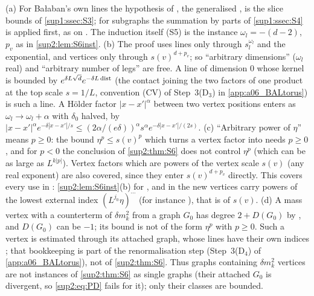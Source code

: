 \begin{remark}\label{sup2:rem:S6scope}
\textup{(a)} For Ba{\l}aban's own lines the hypothesis of \cite[Prop.~2.2]{Ba3}, the generalised \cite[(2.13)--(2.14)]{Ba3}, is the slice bounds of \cref{sup1:ssec:S3}; for subgraphs \cite[(2.4)]{Ba3} the summation by parts of \cref{sup1:ssec:S4} is applied first, as on \cite[p.~426]{Ba3}. The induction \cite[(2.16)]{Ba3} itself (S5) is the instance $\omega_l=-(d-2)$, $p_v$ as in \cref{sup2:lem:S6inst}.
\textup{(b)} The proof uses lines only through $s_l^{\omega_l}$ and the exponential, and vertices only through $s(v)^{d+p_v}$; so ``arbitrary dimensions'' ($\omega_l$ real) and ``arbitrary number of legs'' are free. A line of dimension $0$ whose kernel is bounded by $e^{\delta L\sqrt d}e^{-\delta L\operatorname{dist}}$ (the contact joining the two factors of one product \cite[(1.18)]{Ba3} at the top scale $s=1/L$, convention (CV) of Step~3(D$_3$) in \cref{app:a06_BALtorus}) is such a line. A H\"older factor $|x-x'|^{\alpha}$ between two vertex positions enters as $\omega_l\to\omega_l+\alpha$ with $\delta_0$ halved, by $|x-x'|^{\alpha}e^{-\delta|x-x'|/s}\le(2\alpha/(e\delta))^{\alpha}s^{\alpha}e^{-\delta|x-x'|/(2s)}$.
\textup{(c)} ``Arbitrary power of $\eta$'' means $p\ge0$: the bound $\eta^{p}\le s(v)^{p}$ which turns a vertex factor into \cite[(2.14)]{Ba3} needs $p\ge0$, and for $p<0$ the conclusion of \cref{sup2:thm:S6} does not control $\eta^{p}$ (which can be as large as $L^{k|p|}$). Vertex factors which are powers of the vertex scale $s(v)$ (any real exponent) are also covered, since they enter $s(v)^{d+p_v}$ directly. This covers every use in \cite{Ba3}: \cref{sup2:lem:S6inst}(b) for \cite[(1.6)--(1.15)]{Ba3}, and in \cite[Sect.~3]{Ba3} the new vertices carry powers of the lowest external index $(L^{j_0}\eta)^{\cdots}$ (for instance \cite[(3.30), p.~442]{Ba3}), that is of $s(v)$.
\textup{(d)} A mass vertex \cite[(1.7)]{Ba3} with a counterterm of $\delta m^2_k$ from a graph $G_0$ has degree $2+D(G_0)$ by \cite[(2.3)]{Ba3}, and $D(G_0)$ can be $-1$; its bound is not of the form $\eta^{p}$ with $p\ge0$. Such a vertex is estimated through its attached graph, whose lines have their own indices \cite[(1.27)--(1.28)]{Ba3}; that bookkeeping is part of the renormalisation step (Step~3(D$_4$) of \cref{app:a06_BALtorus}), not of \cref{sup2:thm:S6}. Thus graphs containing $\delta m^2_k$ vertices are not instances of \cref{sup2:thm:S6} as single graphs (their attached $G_0$ is divergent, so \eqref{sup2:eq:PD} fails for it); only their classes are bounded.
\end{remark}
